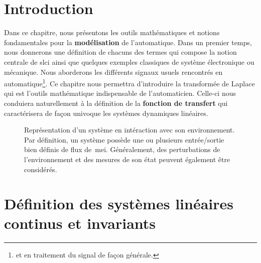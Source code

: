 \section{Introduction}
Dans ce chapitre, nous présentons les outils mathématiques 
et notions fondamentales pour la \textbf{modélisation} de l'automatique.
Dans un premier temps, nous donnerons une définition de chacuns 
des termes qui compose la notion centrale de \gls{slci} ainsi que quelques
exemples classiques de système électronique ou mécanique.
Nous aborderons les différents signaux usuels rencontrés
en automatique\footnote{et en traitement du signal de façon générale.}.
Ce chapitre nous permettra d'introduire la transformée de Laplace qui 
est l'outils mathématique indispensable de l'automaticien.
Celle-ci nous conduiera naturellement à la définition 
de la \textbf{fonction de transfert} qui caractérisera de façon univoque 
les systèmes dynamiques linéaires.
\begin{figure}[!h]
    \centering
    
    \caption{Représentation d'un système en intéraction avec son environnement. 
             Par définition, un système possède une ou plusieurs entrée/sortie 
             bien définis de flux de~\gls{mei}. Généralement, des 
             perturbations de l'environnement et des mesures de son état 
             peuvent également être considérés.\label{fig-systeme}}
\end{figure}
\newpage
{}
\captionsetup{width=0.9\linewidth}
\section[Définition SLCI]
        {Définition des systèmes linéaires continus et invariants}
